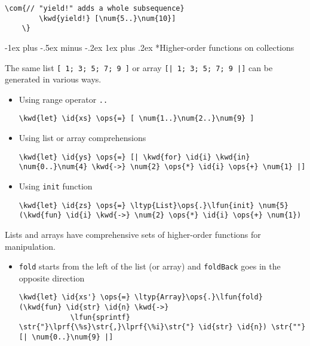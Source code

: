 \documentclass[10pt,landscape]{article}
\makeatletter
\renewcommand{\subsubsection}{\@startsection{subsubsection}{3}{0mm}%
                                {-1ex plus -.5ex minus -.2ex}%
                                {1ex plus .2ex}%
                                {\normalfont\small\bfseries}}
\newcommand{\id}[1]{\textcolor[HTML]{000000}{#1}}
\newcommand{\str}[1]{\textcolor[HTML]{A31515}{#1}}
\newcommand{\kwd}[1]{\textcolor[HTML]{0000FF}{#1}}
\newcommand{\com}[1]{\textcolor[HTML]{008000}{#1}}
\newcommand{\ops}[1]{\textcolor[HTML]{000000}{#1}}
\newcommand{\num}[1]{\textcolor[HTML]{000000}{#1}}
\newcommand{\ltyp}[1]{\textcolor[HTML]{2B91AF}{#1}}
\newcommand{\lfun}[1]{\textcolor[HTML]{AA5500}{#1}}
\newcommand{\lprf}[1]{\textcolor[HTML]{2B91AF}{#1}}
\makeatother
\begin{document}
\begin{multicols}{3}
\begin{Verbatim}[commandchars=\\\{\}]
        \com{// "yield!" adds a whole subsequence}
        \kwd{yield!} [\num{5..}\num{10}]
    \}

\end{Verbatim}

\subsubsection*{Higher-order functions on collections}



The same list \texttt{[ 1; 3; 5; 7; 9 ]} or array \texttt{[| 1; 3; 5; 7; 9 |]} can be generated in various ways.
\begin{itemize}
\item 

Using range operator \texttt{..}
\begin{Verbatim}[commandchars=\\\{\}]
 \kwd{let} \id{xs} \ops{=} [ \num{1..}\num{2..}\num{9} ]
\end{Verbatim}


\item 

Using list or array comprehensions
\begin{Verbatim}[commandchars=\\\{\}]
 \kwd{let} \id{ys} \ops{=} [| \kwd{for} \id{i} \kwd{in} \num{0..}\num{4} \kwd{->} \num{2} \ops{*} \id{i} \ops{+} \num{1} |]
\end{Verbatim}


\item 

Using \texttt{init} function
\begin{Verbatim}[commandchars=\\\{\}]
 \kwd{let} \id{zs} \ops{=} \ltyp{List}\ops{.}\lfun{init} \num{5} (\kwd{fun} \id{i} \kwd{->} \num{2} \ops{*} \id{i} \ops{+} \num{1})
\end{Verbatim}


\end{itemize}



Lists and arrays have comprehensive sets of higher-order functions for manipulation.
\begin{itemize}
\item 

\texttt{fold} starts from the left of the list (or array) and \texttt{foldBack} goes in the opposite direction
\begin{Verbatim}[commandchars=\\\{\}]
\kwd{let} \id{xs'} \ops{=} \ltyp{Array}\ops{.}\lfun{fold} (\kwd{fun} \id{str} \id{n} \kwd{->} 
            \lfun{sprintf} \str{"}\lprf{\%s}\str{,}\lprf{\%i}\str{"} \id{str} \id{n}) \str{""} [| \num{0..}\num{9} |]
\end{Verbatim}



\end{itemize}
\end{multicols}
\end{document}
